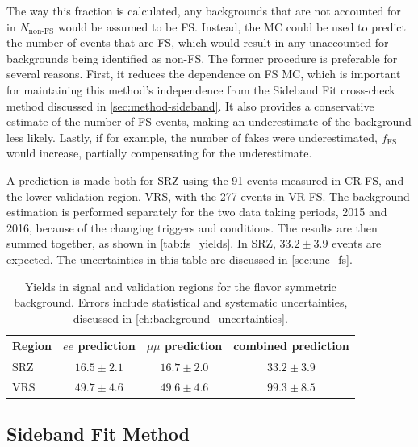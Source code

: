 The way this fraction is calculated, any backgrounds that are not accounted for in $N_\text{non-FS}$ would be assumed to be \ac{FS}. Instead, the \ac{MC} could be used to predict the number of events that are \ac{FS}, which would result in any unaccounted for backgrounds being identified as non-\ac{FS}. The former procedure is preferable for several reasons. First, it reduces the dependence on \ac{FS} \ac{MC}, which is important for maintaining this method's independence from the Sideband Fit cross-check method discussed in \autoref{sec:method-sideband}. It also provides a conservative estimate of the number of \ac{FS} events, making an underestimate of the background less likely. Lastly, if for example, the number of fakes were underestimated, $f_{\mathrm{FS}}$ would increase, partially compensating for the underestimate.  

A prediction is made both for SRZ using the 91 events measured in CR-FS, and the lower-\met validation region, VRS, with the 277 events in VR-FS. The background estimation is performed separately for the two data taking periods, 2015 and 2016, because of the changing triggers and conditions. The results are then summed together, as shown in \autoref{tab:fs_yields}. In SRZ, $33.2 \pm 3.9$ events are expected. The uncertainties in this table are discussed in \autoref{sec:unc_fs}.

\begin{table}
\begin{center}
 \begin{tabular}{lccc}
   \hline 
   Region & $ee$ prediction & $\mu\mu$ prediction & combined prediction \\
   \hline
   \hline
SRZ & $ 16.5 \pm 2.1 $ & $ 16.7 \pm 2.0 $ & $ 33.2 \pm 3.9 $ \\
VRS & $ 49.7 \pm 4.6 $ & $ 49.6 \pm 4.6 $ & $ 99.3 \pm 8.5 $ \\
\hline
\hline
 \end{tabular}
\end{center}
 \caption{
   Yields in signal and validation regions for the flavor symmetric background. Errors include statistical and systematic uncertainties, discussed in \autoref{ch:background_uncertainties}. }
 \label{tab:fs_yields}
\end{table}

\subsection{Sideband Fit Method}
\label{sec:method-sideband}

